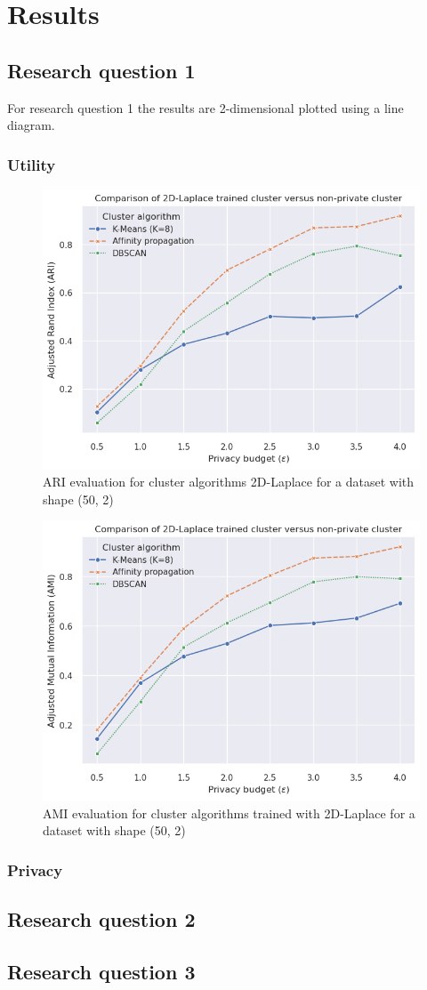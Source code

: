 \section{Results}
\subsection{Research question 1}
For research question 1 the results are 2-dimensional plotted using a line diagram.

\subsubsection{Utility}
\begin{figure}[h]
  \includegraphics[width=0.7\linewidth]{Results/ARI-epsilons.png}
  \caption{ARI evaluation for cluster algorithms 2D-Laplace for a dataset with shape (50, 2)}
\end{figure}
\begin{figure}[h]
  \includegraphics[width=0.7\linewidth]{Results/AMI-epsilons.png}
  \caption{AMI evaluation for cluster algorithms trained with 2D-Laplace for a dataset with shape (50, 2)}
\end{figure}
\subsubsection{Privacy}
\subsection{Research question 2}
\subsection{Research question 3}